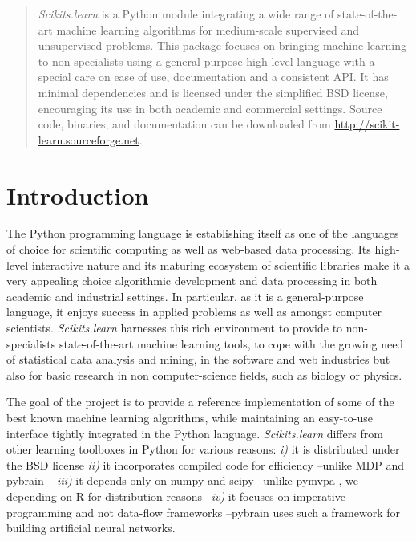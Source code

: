 \documentclass[twoside,11pt]{article}
\begin{document}
\maketitle

\begin{abstract}
\emph{Scikits.learn} is a Python module integrating
a wide range of state-of-the-art machine learning algorithms for
medium-scale supervised and unsupervised problems. This package
focuses on bringing machine learning to non-specialists using a
general-purpose high-level language with a special care on ease of use,
documentation and a consistent API.
%
It has minimal dependencies and is licensed under the simplified BSD
license, encouraging its use in both academic and commercial settings. Source
code, binaries, and documentation can be downloaded from
\url{http://scikit-learn.sourceforge.net}.

\end{abstract}





\section{Introduction}

The Python programming language is establishing itself as one of the
languages of choice for scientific computing as well as web-based data
processing. Its high-level interactive nature and its maturing ecosystem
of scientific libraries \citep{cise2007,cise2011} make it a very
appealing choice algorithmic development and data processing in both
academic and industrial settings. In particular, as it is a
general-purpose language, it enjoys success in applied problems as well
as amongst computer scientists.
%
{\sl Scikits.learn} harnesses this rich environment to provide to
non-specialists state-of-the-art machine learning tools, to cope with the
growing need of statistical data analysis and mining, in the software and
web industries but also for basic research in non computer-science
fields, such as biology or physics.

The goal of the project is to provide a reference implementation of some
of the best known machine learning algorithms, while maintaining an
easy-to-use interface tightly integrated in the Python language.
\emph{Scikits.learn} differs from other learning toolboxes in Python for
various reasons: \emph{i)} it is distributed under the BSD license
\emph{ii)} it incorporates compiled code for efficiency --unlike MDP
\citep{zito2008} and pybrain \citep{schaul2010}-- \emph{iii)} it depends
only on numpy and scipy --unlike pymvpa \citep{hanke2009}, we depending
on R for distribution reasons-- \emph{iv)} it focuses on imperative
programming and not data-flow frameworks --pybrain uses such a framework
for building artificial neural networks.
\end{document}
